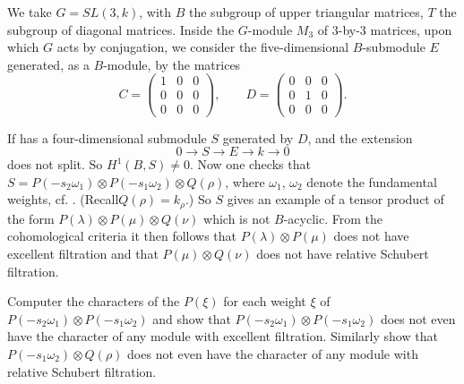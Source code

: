 \begin{example}\label{chap5-exam5.3.1}
We take $G=SL(3,k)$, with $B$ the subgroup of upper triangular
matrices, $T$ the subgroup of diagonal matrices. Inside the $G$-module
$M_{3}$ of 3-by-3 matrices, upon which $G$ acts by conjugation, we
consider the five-dimensional $B$-submodule $E$ generated, as a
$B$-module, by the matrices
$$
C=
\begin{pmatrix}
1 & 0 & 0\\
0 & 0 & 0\\
0 & 0 & 0
\end{pmatrix},\qquad
D=
\begin{pmatrix}
0 & 0 & 0\\
0 & 1 & 0\\
0 & 0 & 0
\end{pmatrix}.
$$

If has a four-dimensional submodule $S$ generated by $D$, and the
extension
$$
0\to S\to E\to k\to 0
$$
does not split. So $H^{1}(B,S)\neq 0$. Now one checks that
$S=P(-s_{2}\omega_{1})\otimes P(-s_{1}\omega_{2})\otimes Q(\rho)$,
where $\omega_{1}$, $\omega_{2}$ denote the fundamental weights, cf.\@
\cite{key11}. (Recall\pageoriginale $Q(\rho)=k_{\rho}$.)\label{page55} So $S$ gives
an example of a tensor product of the form $P(\lambda)\otimes
P(\mu)\otimes Q(\nu)$ which is not $B$-acyclic. From the cohomological
criteria it then follows that $P(\lambda)\otimes P(\mu)$ does not have
excellent filtration and that $P(\mu)\otimes Q(\nu)$ does not have
relative Schubert filtration. 
\end{example}

\begin{exercise}[Polo]\label{chap5-exer5.3.2}
Computer the characters of the $P(\xi)$ for each weight $\xi$ of
$P(-s_{2}\omega_{1})\otimes P(-s_{1}\omega_{2})$ and show that
$P(-s_{2}\omega_{1})\otimes P(-s_{1}\omega_{2})$ does not even have
the character of any module with excellent filtration. Similarly show
that $P(-s_{1}\omega_{2})\otimes Q(\rho)$ does not even have the
character of any module with relative Schubert filtration.
\end{exercise}
